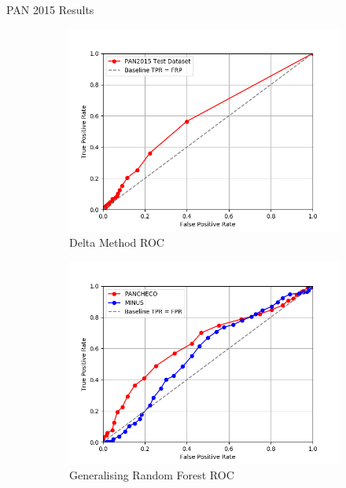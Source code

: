 \documentclass[10pt]{beamer}
\begin{document}
\begin{frame}[fragile]{PAN 2015 Results}
    \begin{figure}
        \begin{subfigure}{.4\textwidth}
            \includegraphics[width=\textwidth]{../../report/pictures/delta_method_roc.png}
            \caption{Delta Method ROC}
        \end{subfigure}
        \begin{subfigure}{.4\textwidth}
            \includegraphics[width=\textwidth]{../../report/pictures/forest_roc.png}
            \caption{Generalising Random Forest ROC}
        \end{subfigure}
        \begin{subfigure}{.4\textwidth}

\end{subfigure}
\end{figure}
\end{frame}
\end{document}
